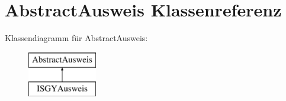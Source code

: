 \hypertarget{class_abstract_ausweis}{}\section{Abstract\+Ausweis Klassenreferenz}
\label{class_abstract_ausweis}
Klassendiagramm für Abstract\+Ausweis\+:\begin{figure}[H]
\begin{center}
\leavevmode
\includegraphics[height=2.000000cm]{class_abstract_ausweis}
\end{center}
\end{figure}
